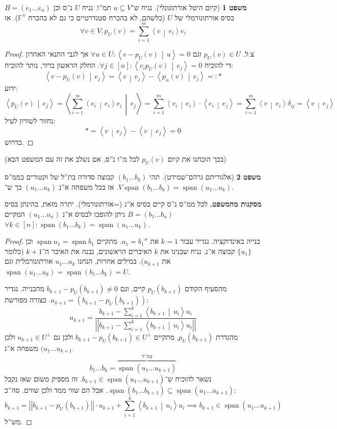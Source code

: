 \documentclass[a4paper]{article}
\newcommand\ra    {\rangle}
\newcommand\la    {\langle}
\DeclareMathOperator{\Sp}      {span}
\newcommand\F         {\mathbb{F}}
\newcommand\co        {\colon}
\newcommand\norm[1]   {\left \vert \left \vert #1 \right \vert \right \vert}
\newcommand\mut [2]   {\left \la #1 \,\middle\vert\, #2 \right \ra}
\theoremstyle{definition}
\newtheorem{Theorem}{משפט}
\begin{document}
	\begin{Theorem}[קיום היטל אורתוגונלי]
		נניח ש־$u \subseteq V$ תמ''ו. נניח $U$ נ''ס וכן $B = (e_1 \dots e_n)$ בסיס אורתונורמלי של $U$ (כלשהם, לא בהכרח סטנדרטיים כי גם לא בהכרח $\F^n$). אז 
		\[ \forall v \in V \co p_U(v) = \sum_{i = 1}^{m}\mut{v}{e_i}e_i \]
	\end{Theorem}
	\begin{proof}
		צ.ל. $p_U(v) \in U$ וגם $\forall u \in U \co \mut{v - p_U(v)}{u} = 0$ אך לגבי התנאי האחרון די להוכיח $\forall j \in [n] \co \mut{v_i p_U(v)}{e_j}  = 0$. החלק הראשון ברור, נותר להוכיח: 
		\[ \mut{v - p_U(v)}{e_j} = \mut{v}{e_j} - \mut{p_u(v)}{e_j} =: * \]
		ידוע: 
		\[ \mut{p_U(v)}{e_j} = \mut{\sum_{i = 1}^{m}\mut{v_i}{e_i} e_i}{e_j} = \sum_{i = 1}^{m}\mut{v_i}{e_i} \cdot \mut{e_i}{e_j} = \sum_{i = 1}^{m}\mut{v}{e_i}\delta_{ij} = \mut{v}{e_j} \]
		נחזור לשוויון לעיל: 
		\[ *= \mut{v}{e_j} - \mut{v}{e_j} = 0 \]
		כדרוש. 
	\end{proof}
	(בכך הוכחנו את קיום $p_U(v)$ לכל מ''ו נ''ס, אם נשלב את זה עם המשפט הבא)
	
	\begin{Theorem}[אלגוריתם גרהם־שמידט]
		תהי $(b_1 \dots b_k)$ קבוצה סדורה בת''ל של וקטורים בממ''ס $V$. אז בכל משפחה א''נ $(u_1 \dots u_k)$ כך ש־$\Sp(b_1 \dots b_k) = \Sp(u_1 \dots u_k)$. 
	\end{Theorem}
	\textbf{מסקנות מהמשפט. }לכל ממ''ס נ''ס קיים בסיס א''נ (=אורתונורמלי). יתרה מזאת, בהינתן בסיס $B = (b_1 \dots b_n)$ ניתן להופכו לבסיס א''נ $(u_1 \dots u_n)$ המקיים $\forall k \in [n] \co \Sp (b_1 \dots b_k) = \Sp(u_1 \dots u_k)$. 
	
	\begin{proof}
		בנייה באינדוקציה. נגדיר עבור $k = 1$ את $u_1 = b_1''$. מתקיים $\Sp u_1 = \Sp b_1$ וכן $\{u_1\}$ קבוצה א''נ. נניח שבנינו את $k$ האיברים הראשונים, נבנה את האיבר ה־$k + 1$ (כלומר את $u_{k + 1}$). במילים אחרות, הנחנו $u_1 \dots u_k$ אורתונורמלית וגם $\Sp (u_1 \dots u_k) = \Sp(b_1 \dots b_k) = U$. 
		
		מהסעיף הקודם $p_U(b_{k + 1})$ קיים, וגם $b_{k + 1} - p_U(b_{k + 1}) \neq 0$ מהבנייה. נגדיר $u_{k + 1} = (b_{k + 1} - p_U(b_{k + 1}))$. בצורה מפורשת: 
		\[ u_{k + 1} = \frac{b_{k + 1} - \sum_{i = 1}^{k}\mut{b_{k + 1}}{u_i}u_i}{\norm{b_{k + 1} - \sum_{i = 1}^{k}\mut{b_{k + 1}}{u_i}u_i}} \]
		מהגדרת $p_U(b_{k + 1})$, מתקיים $b_{k + 1} - p_U(b_{k + 1}) \in U^{\perp}$ ולכן גם $u_{k + 1} \in U^{\perp}$ ולכן $(u_1 \dots u_{k + 1}$ משפחה א''נ. 
		\[ b_1 \dots b_k = \overbrace{\Sp(u_1 \dots u_{k + 1})}^{\,\!\text{בת''ל}} \]
		נשאר להוכיח ש־$b_{k + 1} \in \Sp(u_1 \dots u_{k + 1})$. זה מספיק משום שאז נקבל $\Sp(b_1 \dots b_{k + 1}) \subseteq \Sp(u_1 \dots u_{k + 1})$. אבל הם שווי ממד ולכן שווים. סה''כ: 
		\[ b_{k + 1} = \norm{b_{k + 1} - p_U(b_{b + 1})} \cdot u_{k + 1} + \sum_{i = 1}^{k}\mut{b_{k + 1}}{u_i}u_i \implies b_{k + 1} \in \Sp(u_1 \dots u_{k + 1}) \]
		מש''ל. 
	\end{proof}
	
\end{document}
